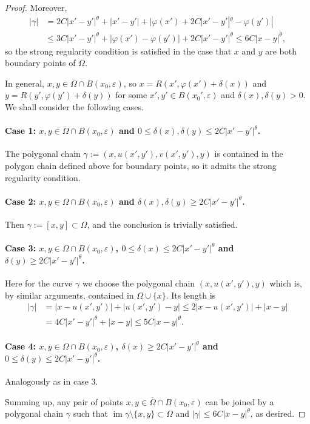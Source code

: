\documentclass[10pt,leqno]{amsart}
\theoremstyle{definition}
\newcommand{\im}{\operatorname{im}}
\let\epsilon\varepsilon
\let\phi\varphi
\begin{document}
\begin{proof}
Moreover,
\begin{align*}
|\gamma|&=2C|x'-y'|^\theta+|x'-y'|+|\phi(x')+2C|x'-y'|^\theta-\phi(y')|\\
&\leq 3C|x'-y'|^\theta+|\phi(x')-\phi(y')|+2C|x'-y'|^\theta\leq6C|x-y|^\theta,
\end{align*}
so the strong regularity condition is satisfied in the case that $x$ and $y$ are both boundary points of $\Omega$. 


In general, $x,y\in\overline{\Omega}\cap B(x_0,\epsilon)$, so $x=R(x',\phi(x')+\delta(x))$ and $y=R(y',\phi(y')+\delta(y))$ for some $x',y'\in B(x_0',\epsilon)$ and $\delta(x),\delta(y)>0$. 
We shall consider the following cases.
\paragraph{Case 1: $x,y\in\overline{\Omega}\cap B(x_0,\epsilon)$ and $0\leq\delta(x),\delta(y)\leq2C|x'-y'|^\theta$.}  The polygonal chain 
$\gamma:=(x,u(x',y'),v(x',y'),y)$
is contained in the polygon chain defined above for boundary points, so it admits the strong regularity condition.  

\paragraph{Case 2: $x,y\in\Omega\cap B(x_0,\epsilon)$ and $\delta(x),\delta(y)\geq2C|x'-y'|^\theta$.}
Then $\gamma:=[x,y]\subset\Omega$, and the conclusion is trivially satisfied.

\paragraph{Case 3: $x,y\in\Omega\cap B(x_0,\epsilon)$, $0\leq\delta(x)\leq2C|x'-y'|^\theta$ and $\delta(y)\geq2C|x'-y'|^\theta$.} Here for the curve $\gamma$ we choose the polygonal chain
$(x,u(x',y'),y)$ which is, by similar arguments, contained in $\Omega\cup\{x\}$. Its length is
\begin{align*}
|\gamma|&=|x-u(x',y')|+|u(x',y')-y|\leq2|x-u(x',y')|+|x-y|\\
&=4C|x'-y'|^\theta+|x-y|\leq5C|x-y|^\theta. 
\end{align*}

\paragraph{Case 4: $x,y\in\Omega\cap B(x_0,\epsilon)$, $\delta(x)\geq2C|x'-y'|^\theta$ and $0\leq\delta(y)\leq2C|x'-y'|^\theta$.}
Analogously as in case 3.

Summing up, any pair of points $x,y\in\overline{\Omega}\cap B(x_0,\epsilon)$ can be joined by a polygonal chain $\gamma$ such that $\im\gamma\setminus\{x,y\}\subset\Omega$ and $|\gamma|\leq6C|x-y|^\theta$, as desired.    
\end{proof}
\end{document}

